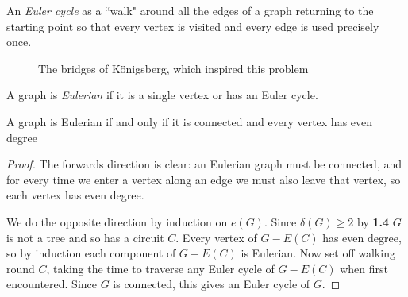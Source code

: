 \documentclass[10pt,a4paper]{article}
\begin{document}
An \emph{Euler cycle} as a ``walk" around all the edges of a graph returning to the starting point so that every vertex is visited and every edge is used precisely once.
\begin{figure}
\centering
{}
\caption*{The bridges of K\"onigsberg, which inspired this problem}
\end{figure}

A graph is \emph{Eulerian} if it is a single vertex or has an Euler cycle.
\begin{theorem}
A graph is Eulerian if and only if it is connected and every vertex has even degree
\end{theorem}
\begin{proof}
The forwards direction is clear: an Eulerian graph must be connected, and for every time we enter a vertex along an edge we must also leave that vertex, so each vertex has even degree.

We do the opposite direction by induction on $e(G)$. Since $\delta(G) \geq 2$ by \textbf{1.4} $G$ is not a tree and so has a circuit $C$. Every vertex of $G-E(C)$ has even degree, so by induction each component of $G-E(C)$ is Eulerian. Now set off walking round $C$, taking the time to traverse any Euler cycle of $G-E(C)$ when first encountered. Since $G$ is connected, this gives an Euler cycle of $G$.
\end{proof}
\end{document}
